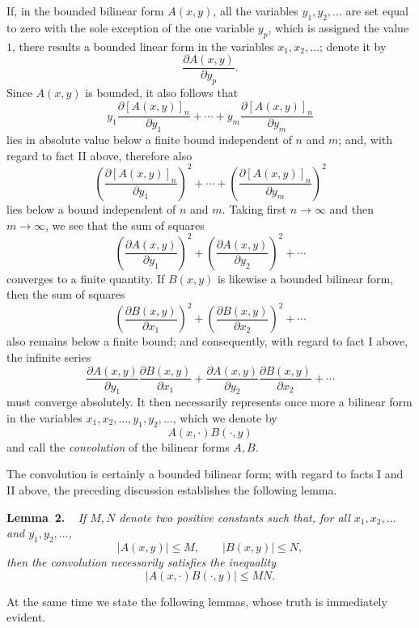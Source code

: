 \documentclass[b5paper,twoside]{article}
\makeatletter
\newcommand{\hilbertstatementname}[2]{%
  \textbf{#1\if\relax\detokenize{#2}\relax\else\ #2\fi.}%
}
\newenvironment{lemma}[1][]{%
  \par\addvspace{.7\baselineskip}%
  \phantomsection
  \protected@edef\@currentlabel{#1}%
  \noindent\hilbertstatementname{Lemma}{#1}\ \itshape\ignorespaces
}{%
  \par\addvspace{.7\baselineskip}%
}
\newcommand{\originalpage}[1]{\phantomsection\label{origpage:#1}}
\makeatother
\begin{document}
If, in the bounded bilinear form $A(x,y)$, all the variables
$y_1,y_2,\ldots$ are set equal to zero with the sole exception of the one
variable $y_p$, which is assigned the value $1$, there results a bounded
linear form in the variables $x_1,x_2,\ldots$; denote it by
\[
  \frac{\partial A(x,y)}{\partial y_p}.
\]
Since $A(x,y)$ is bounded, it also follows that
\[
  y_1\frac{\partial[A(x,y)]_n}{\partial y_1}
  +\cdots+
  y_m\frac{\partial[A(x,y)]_n}{\partial y_m}
\]
lies in absolute value below a finite bound independent of $n$ and $m$; and,
with regard to fact II above, therefore also
\[
  \left(\frac{\partial[A(x,y)]_n}{\partial y_1}\right)^2
  +\cdots+
  \left(\frac{\partial[A(x,y)]_n}{\partial y_m}\right)^2
\]
lies below a bound independent of $n$ and $m$.  Taking first $n\to\infty$ and
then $m\to\infty$, we see that the
\originalpage{179}sum of squares
\[
  \left(\frac{\partial A(x,y)}{\partial y_1}\right)^2
  +\left(\frac{\partial A(x,y)}{\partial y_2}\right)^2+\cdots
\]
converges to a finite quantity.  If $B(x,y)$ is likewise a bounded bilinear
form, then the sum of squares
\[
  \left(\frac{\partial B(x,y)}{\partial x_1}\right)^2
  +\left(\frac{\partial B(x,y)}{\partial x_2}\right)^2+\cdots
\]
also remains below a finite bound; and consequently, with regard to fact I
above, the infinite series
\[
  \frac{\partial A(x,y)}{\partial y_1}
  \frac{\partial B(x,y)}{\partial x_1}
  +\frac{\partial A(x,y)}{\partial y_2}
  \frac{\partial B(x,y)}{\partial x_2}+\cdots
\]
must converge absolutely.  It then necessarily represents once more a
bilinear form in the variables
$x_1,x_2,\ldots,y_1,y_2,\ldots$, which we denote by
\[
  A(x,\mathord{\cdot})B(\mathord{\cdot},y)
\]
and call the \emph{convolution} of the bilinear forms $A,B$.

The convolution is certainly a bounded bilinear form; with regard to facts I
and II above, the preceding discussion establishes the following lemma.

\begin{lemma}[2]\label{lem:2}
If $M,N$ denote two positive constants such that, for all
$x_1,x_2,\ldots$ and $y_1,y_2,\ldots$,
\[
  |A(x,y)|\le M,
  \qquad
  |B(x,y)|\le N,
\]
then the convolution necessarily satisfies the inequality
\[
  |A(x,\mathord{\cdot})B(\mathord{\cdot},y)|\le MN.
\]
\end{lemma}

At the same time we state the following lemmas, whose truth is immediately
evident.
\end{document}
